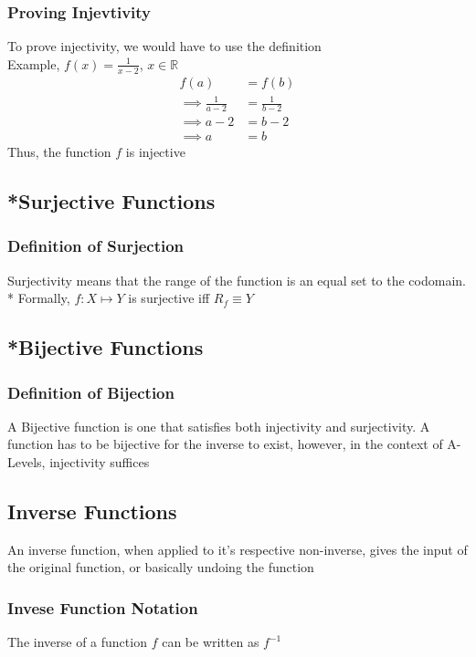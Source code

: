 \documentclass[../main.tex]{subfiles}
\begin{document}
\subsubsection{Proving Injevtivity}
To prove injectivity, we would have to use the definition \\
Example, \(\displaystyle f(x) = \frac{1}{x-2}\), \(x \in \mathbb{R}\)
\begin{align*}
    \displaystyle f(a) &= f(b) \\
    \displaystyle \implies \frac{1}{a-2} &= \frac{1}{b-2} \\
    \displaystyle \implies a-2 &= b-2 \\
    \displaystyle \implies a &= b
\end{align*}
Thus, the function \(f\) is injective

\subsection{*Surjective Functions}
\subsubsection{Definition of Surjection}
Surjectivity means that the range of the function is an
equal set to the codomain. \\*
Formally, \(f: X \mapsto Y\) is surjective iff \(R_{f} \equiv Y\)

\subsection{*Bijective Functions}
\subsubsection{Definition of Bijection}
A Bijective function is one that satisfies both injectivity
and surjectivity. A function has to be bijective for the inverse
to exist, however, in the context of A-Levels, injectivity suffices

\subsection{Inverse Functions}
An inverse function, when applied to it's respective non-inverse, gives
the input of the original function, or basically undoing the function

\subsubsection{Invese Function Notation}
The inverse of a function \(f\) can be written as \(f^{-1}\)
\end{document}
